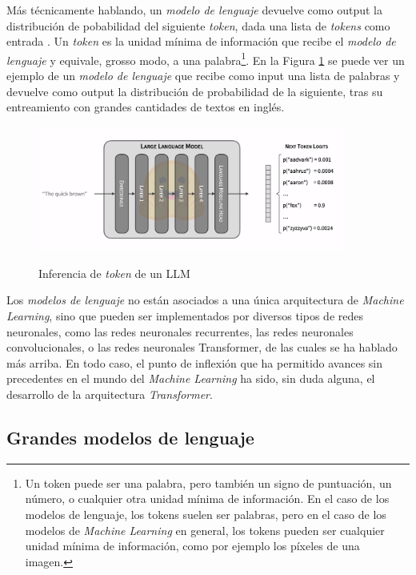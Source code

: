 Más técnicamente hablando, un \textit{modelo de lenguaje} devuelve como output la distribución de pobabilidad del siguiente \textit{token}, dada una lista de \textit{tokens} como entrada \citep{GenerationLLMs}. Un \textit{token} es la unidad mínima de información que recibe el \textit{modelo de lenguaje} y equivale, grosso modo, a una palabra\footnote{Un token puede ser una palabra, pero también un signo de puntuación, un número, o cualquier otra unidad mínima de información. En el caso de los modelos de lenguaje, los tokens suelen ser palabras, pero en el caso de los modelos de \textit{Machine Learning} en general, los tokens pueden ser cualquier unidad mínima de información, como por ejemplo los píxeles de una imagen.}. En la Figura \ref{fig:llm_generation} se puede ver un ejemplo de un \textit{modelo de lenguaje} que recibe como input una lista de palabras y devuelve como output la distribución de probabilidad de la siguiente, tras su entreamiento con grandes cantidades de textos en inglés.

\begin{figure}[]
    \caption[Inferencia de \textit{token} de un LLM]{Inferencia de \textit{token} de un LLM}
    \centering
    \includegraphics[width=0.9\textwidth]{./figuras/LLM_predice_token.png}
    \label{fig:llm_generation}
\end{figure}

Los \textit{modelos de lenguaje} no están asociados a una única arquitectura de \textit{Machine Learning}, sino que pueden ser implementados por diversos tipos de redes neuronales, como las redes neuronales recurrentes, las redes neuronales convolucionales, o las redes neuronales Transformer, de las cuales se ha hablado más arriba. En todo caso, el punto de inflexión que ha permitido avances sin precedentes en el mundo del \textit{Machine Learning} ha sido, sin duda alguna, el desarrollo de la arquitectura \textit{Transformer}. 

\subsection{Grandes modelos de lenguaje}

